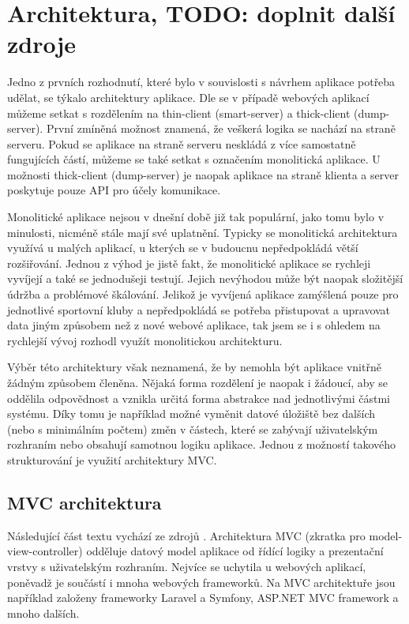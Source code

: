 \section{Architektura, TODO: doplnit další zdroje}
Jedno z prvních rozhodnutí, které bylo v souvislosti s návrhem aplikace potřeba udělat, se týkalo architektury aplikace. Dle \cite{twa_architecture} se v případě webových aplikací můžeme setkat s rozdělením na thin-client (smart-server) a thick-client (dump-server). První zmíněná možnost znamená, že veškerá logika se nachází na straně serveru. Pokud se aplikace na straně serveru neskládá z více samostatně fungujících částí, můžeme se také setkat s označením monolitická aplikace. U možnosti thick-client (dump-server) je naopak aplikace na straně klienta a server poskytuje pouze API pro účely komunikace.

Monolitické aplikace nejsou v dnešní době již tak populární, jako tomu bylo v minulosti, nicméně stále mají své uplatnění. Typicky se monolitická architektura využívá u malých aplikací, u kterých se v budoucnu nepředpokládá větší rozšiřování. Jednou z výhod je jistě fakt, že monolitické aplikace se rychleji vyvíjejí a také se jednodušeji testují. Jejich nevýhodou může být naopak složitější údržba a problémové škálování. \cite{twa_architecture} Jelikož je vyvíjená aplikace zamýšlená pouze pro jednotlivé sportovní kluby a nepředpokládá se potřeba přistupovat a upravovat data jiným způsobem než z nové webové aplikace, tak jsem se i s ohledem na rychlejší vývoj rozhodl využít monolitickou architekturu.

Výběr této architektury však neznamená, že by nemohla být aplikace vnitřně žádným způsobem členěna. Nějaká forma rozdělení je naopak i žádoucí, aby se oddělila odpovědnost a vznikla určitá forma abstrakce nad jednotlivými částmi systému. Díky tomu je například možné vyměnit datové úložiště bez dalších (nebo s minimálním počtem) změn v částech, které se zabývají uživatelským rozhraním nebo obsahují samotnou logiku aplikace. Jednou z možností takového strukturování je využití architektury MVC.

\subsection{MVC architektura}
Následující část textu vychází ze zdrojů \cite{it_network_mvc, mdn_mvc}. Architektura MVC (zkratka pro model-view-controller) odděluje datový model aplikace od řídící logiky a prezentační vrstvy s uživatelským rozhraním. Nejvíce se uchytila u webových aplikací, poněvadž je součástí i mnoha webových frameworků. Na MVC architektuře jsou například založeny frameworky Laravel a Symfony, ASP.NET MVC framework a mnoho dalších.

